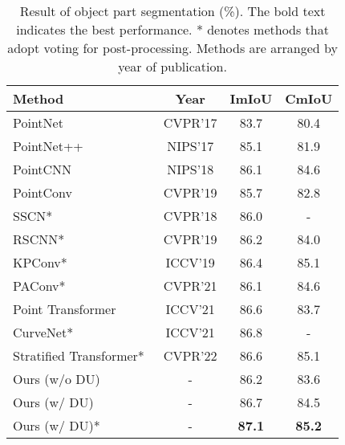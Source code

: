 \documentclass[a4paper,fleqn]{cas-dc}
\begin{document}
\begin{table}[t]
\centering
    \caption{Result of object part segmentation (\%). The bold text indicates the best performance. * denotes methods that adopt voting for post-processing. Methods are arranged by year of publication.}
\begin{tabular}{l|ccc}
\toprule
        Method
        & Year
        & ImIoU
        & CmIoU
        \\
\midrule
        PointNet~\cite{qi2017pointnet}
        & CVPR'17
        & 83.7
        & 80.4
        \\
        PointNet++~\cite{qi2017pointnet++}
        & NIPS'17
        &85.1 
        &81.9
        \\
        PointCNN~\cite{li2018pointcnn}
        & NIPS'18
        &86.1
        &84.6
        \\
        PointConv~\cite{wu2019pointconv}
        & CVPR'19
        &85.7
        &82.8
        \\
        SSCN*~\cite{graham20183d}
        & CVPR'18
        & 86.0
        & -
        \\
        RSCNN*~\cite{liu2019relation}
        & CVPR'19
        &86.2 
        &84.0
        \\
KPConv*~\cite{thomas2019kpconv}
        & ICCV'19
        &86.4 
        & 85.1
        \\
        PAConv*~\cite{xu2021paconv}
        & CVPR'21
        &86.1 
        & 84.6
        \\
        Point Transformer~\cite{zhao2021point}
        & ICCV'21
        & 86.6
        & 83.7
        \\
        CurveNet*~\cite{xiang2021walk}
        & ICCV'21
        & 86.8
        & -
        \\
        Stratified Transformer*~\cite{lai2022stratified}
        & CVPR'22
        & 86.6
        & 85.1
        \\
\midrule
        Ours (w/o DU)
        & -
        & 86.2
        & 83.6
        \\
Ours (w/ DU)
        & - 
        & 86.7
        & 84.5
        \\
        Ours (w/ DU)*
        & -
        & \textbf{87.1}
        & \textbf{85.2}
        \\
        \bottomrule
    \end{tabular}
\label{tab: result of object part segmentation}
\end{table}
\end{document}
